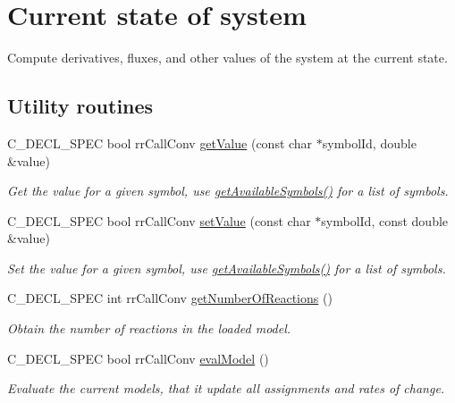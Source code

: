 \hypertarget{group__state}{
\section{\-Current state of system}
\label{group__state}
}


\-Compute derivatives, fluxes, and other values of the system at the current state.  


\subsection*{\-Utility routines}
\begin{DoxyCompactItemize}
\item 
\-C\-\_\-\-D\-E\-C\-L\-\_\-\-S\-P\-E\-C bool rr\-Call\-Conv \hyperlink{group__utility_gaee1e79b2afc717895d302c51b49aee47}{get\-Value} (const char $\ast$symbol\-Id, double \&value)
\begin{DoxyCompactList}\small\item\em \-Get the value for a given symbol, use \hyperlink{group__state_gae5b437645cc3a7dc3e6b4423f9ac8046}{get\-Available\-Symbols()} for a list of symbols. \end{DoxyCompactList}\item 
\-C\-\_\-\-D\-E\-C\-L\-\_\-\-S\-P\-E\-C bool rr\-Call\-Conv \hyperlink{group__utility_ga8e92a279c4f313cb038f49cc04faed73}{set\-Value} (const char $\ast$symbol\-Id, const double \&value)
\begin{DoxyCompactList}\small\item\em \-Set the value for a given symbol, use \hyperlink{group__state_gae5b437645cc3a7dc3e6b4423f9ac8046}{get\-Available\-Symbols()} for a list of symbols. \end{DoxyCompactList}\item 
\-C\-\_\-\-D\-E\-C\-L\-\_\-\-S\-P\-E\-C int rr\-Call\-Conv \hyperlink{group__utility_gae25399f84ff2d1fda619358a1af9a1b5}{get\-Number\-Of\-Reactions} ()
\begin{DoxyCompactList}\small\item\em \-Obtain the number of reactions in the loaded model. \end{DoxyCompactList}\item 
\-C\-\_\-\-D\-E\-C\-L\-\_\-\-S\-P\-E\-C bool rr\-Call\-Conv \hyperlink{group__utility_ga3fbb7c2fab261f25a3871f1caf398ff1}{eval\-Model} ()
\begin{DoxyCompactList}\small\item\em \-Evaluate the current models, that it update all assignments and rates of change. \end{DoxyCompactList}\item 

\end{DoxyCompactItemize}
